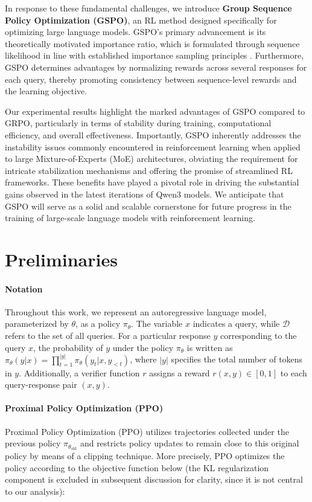 In response to these fundamental challenges, we introduce \textbf{Group Sequence Policy Optimization (GSPO)}, an RL method designed specifically for optimizing large language models. GSPO's primary advancement is its theoretically motivated importance ratio, which is formulated through sequence likelihood in line with established importance sampling principles \citep{click}. Furthermore, GSPO determines advantages by normalizing rewards across several responses for each query, thereby promoting consistency between sequence-level rewards and the learning objective.

Our experimental results highlight the marked advantages of GSPO compared to GRPO, particularly in terms of stability during training, computational efficiency, and overall effectiveness. Importantly, GSPO inherently addresses the instability issues commonly encountered in reinforcement learning when applied to large Mixture-of-Experts (MoE) architectures, obviating the requirement for intricate stabilization mechanisms and offering the promise of streamlined RL frameworks. These benefits have played a pivotal role in driving the substantial gains observed in the latest iterations of Qwen3 models. We anticipate that GSPO will serve as a solid and scalable cornerstone for future progress in the training of large-scale language models with reinforcement learning.

\section{Preliminaries}

\paragraph{Notation}
Throughout this work, we represent an autoregressive language model, parameterized by $\theta$, as a policy $\pi_\theta$. The variable $x$ indicates a query, while $\mathcal{D}$ refers to the set of all queries. For a particular response $y$ corresponding to the query $x$, the probability of $y$ under the policy $\pi_\theta$ is written as $\pi_\theta (y | x)=\prod_{t=1}^{|y|} \pi_\theta (y_t | x, y_{<t} )$, where $|y|$ specifies the total number of tokens in $y$. Additionally, a verifier function $r$ assigns a reward $r(x, y) \in [0, 1]$ to each query-response pair $(x, y)$.

\paragraph{Proximal Policy Optimization (PPO)} Proximal Policy Optimization (PPO) \citep{ppo} utilizes trajectories collected under the previous policy $\pi_{\theta_\text{old}}$ and restricts policy updates to remain close to this original policy by means of a clipping technique. More precisely, PPO optimizes the policy according to the objective function below (the KL regularization component is excluded in subsequent discussion for clarity, since it is not central to our analysis):

